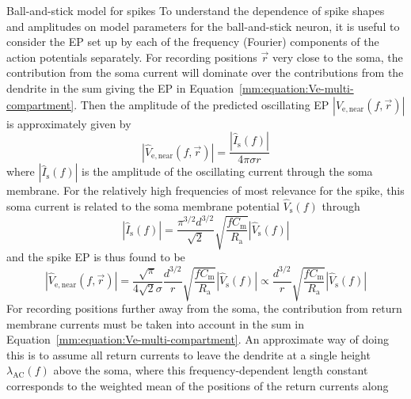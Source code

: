 \begin{boxfloat}{Ball-and-stick model for spikes}
  \label{mm:box:ball-and-stick-spikes}  
To understand the dependence of spike shapes and amplitudes on model parameters for the ball-and-stick neuron, it is useful
to consider the EP set up by each of the frequency (Fourier) components of the action potentials separately. 
For recording positions $\vec{r}$ very close to the soma, the contribution from the soma current will dominate over the contributions from the dendrite 
in the sum giving the EP in Equation~\ref{mm:equation:Ve-multi-compartment}. Then the amplitude of the
predicted oscillating EP $|\hat{V}_\mathrm{e,near}(f,\vec{r})|$ is approximately given by 
%
\begin{equation}
  |\hat{V}_\mathrm{e,near}(f,\vec{r})| = \frac{|\hat{I}_\mathrm{s}(f)|}{4 \pi \sigma r} 
  \label{mm:box:equation:Ve_near_1}
\end{equation}
%
where $|\hat{I}_\mathrm{s}(f)|$ is the amplitude of the oscillating current through the soma membrane.
For the relatively high frequencies of most relevance for the spike, this soma current is related to the soma membrane potential 
$\hat{V}_\mathrm{s}(f)$ through~\citep{Pettersen2008}
%
\begin{equation}
  |\hat{I}_\mathrm{s}(f)| =  \frac{\pi^{3/2} d^{3/2}}{\sqrt{2}} \sqrt{ \frac{f C_\mathrm{m}}{R_\mathrm{a}} }  |\hat{V}_\mathrm{s}(f)|
  \label{mm:box:equation:Isoma}
\end{equation}
%
and the spike EP is thus found to be
%
\begin{equation}
  |\hat{V}_\mathrm{e,near}(f,\vec{r})| 
  = \frac{\sqrt{\pi}}{4 \sqrt{2} \sigma}
     \frac{d^{3/2}}{r} 
     \sqrt{ \frac{f C_\mathrm{m}}{R_\mathrm{a}} }  |\hat{V}_\mathrm{s}(f)| 
  \propto \frac{d^{3/2}}{r} \sqrt{ \frac{f C_\mathrm{m}}{R_\mathrm{a}} }  |\hat{V}_\mathrm{s}(f)| 
  \label{mm:box:equation:Ve_near_2}
\end{equation}
%
%
For recording positions further away from the soma, the contribution from return membrane currents must be taken into
account in the sum in Equation~\ref{mm:equation:Ve-multi-compartment}. An approximate way of doing this is to
assume all return currents to leave the dendrite at a single height $\lambda_\mathrm{AC}(f)$ above the soma, where 
this frequency-dependent length constant corresponds to the weighted mean of the positions of the return currents along

\end{boxfloat}
